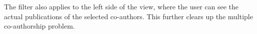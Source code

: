 The filter also applies to the left side of the view, where the user can see the actual publications of the selected co-authors.
This further clears up the multiple co-authorship problem.






    


